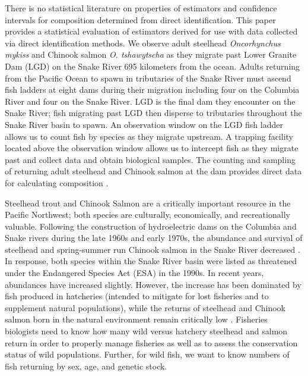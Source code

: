 \documentclass[12pt]{article}
\begin{document}
There is no statistical literature on properties of estimators and confidence intervals for composition determined from direct identification. This paper provides a statistical evaluation of estimators derived for use with data collected via direct identification methods. We observe adult steelhead \textit{Oncorhynchus mykiss} and Chinook salmon \textit{O. tshawytscha} as they migrate past Lower Granite Dam (LGD) on the Snake River 695 kilometers from the ocean. Adults returning from the Pacific Ocean to spawn in tributaries of the Snake River must ascend fish ladders at eight dams during their migration including four on the Columbia River and four on the Snake River. LGD is the final dam they encounter on the Snake River; fish migrating past LGD then disperse to tributaries throughout the Snake River basin to spawn. An observation window on the LGD fish ladder allows us to count fish by species as they migrate upstream.  A trapping facility located above the observation window allows us to intercept fish as they migrate past and collect data and obtain biological samples.  The counting and sampling of returning adult steelhead and Chinook salmon at the dam provides direct data for calculating composition \cite{Harmon2003,Steinhorst2010,Schrader2013}.

Steelhead trout and Chinook Salmon are a critically important resource in the Pacific Northwest; both species are culturally, economically, and recreationally valuable. Following the construction of hydroelectric dams on the Columbia and Snake rivers during the late 1960s and early 1970s, the abundance and survival of steelhead and spring-summer run Chinook salmon in the Snake River decreased \cite{Raymond88}. In response, both species within the Snake River basin were listed as threatened under the Endangered Species Act (ESA) in the 1990s. In recent years, abundances have increased slightly. However, the increase has been dominated by fish produced in hatcheries (intended to mitigate for lost fisheries and to supplement natural populations), while the returns of steelhead and Chinook salmon born in the natural environment remain critically low \cite{Busby1996}. Fisheries biologists need to know how many wild versus hatchery steelhead and salmon return in order to properly manage fisheries as well as to assess the conservation status of wild populations. Further, for wild fish, we want to know numbers of fish returning by sex, age, and genetic stock.
\end{document}
